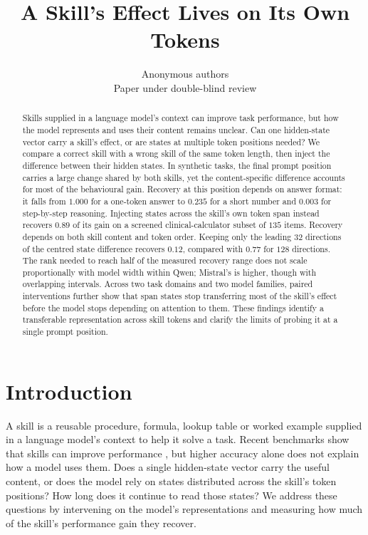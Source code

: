\documentclass{article}
\title{A Skill's Effect Lives on Its Own Tokens}
\author{Anonymous authors \\
Paper under double-blind review}
\begin{document}
\maketitle

\begin{abstract}
Skills supplied in a language model's context can improve task performance,
but how the model represents and uses their content remains unclear. Can one
hidden-state vector carry a skill's effect, or are states at multiple token
positions needed? We compare a correct skill with a wrong skill of the same
token length, then inject the difference between their hidden states. In
synthetic tasks, the final prompt position carries a large change shared by
both skills, yet the content-specific difference accounts for most of the
behavioural gain. Recovery at this position depends on answer format: it falls
from $1.000$ for a one-token answer to $0.235$ for a short number and $0.003$
for step-by-step reasoning. Injecting states across the skill's own token span
instead recovers $0.89$ of its gain on a screened clinical-calculator subset
of $135$ items. Recovery depends on both skill content and token order.
Keeping only the leading $32$ directions of the centred state difference
recovers $0.12$, compared with $0.77$ for $128$ directions. The rank needed to
reach half of the measured recovery range does not scale proportionally with
model width within Qwen; Mistral's is higher, though with overlapping intervals. Across two task
domains and two model families, paired interventions further show that span
states stop transferring most of the skill's effect before the model stops
depending on attention to them. These findings identify a transferable
representation across skill tokens and clarify the limits of probing it at a
single prompt position.
\end{abstract}

\section{Introduction}
\label{sec:intro}

A skill is a reusable procedure, formula, lookup table or worked example supplied
in a language model's context to help it solve a task. Recent benchmarks show
that skills can improve performance \citep{su2026srabench, skillsbench2026},
but higher accuracy alone does not explain how a model uses them. Does a single
hidden-state vector carry the useful content, or does the model rely on states
distributed across the skill's token positions? How long does it continue to
read those states? We address these questions by intervening on the model's
representations and measuring how much of the skill's performance gain they
recover.
\end{document}
